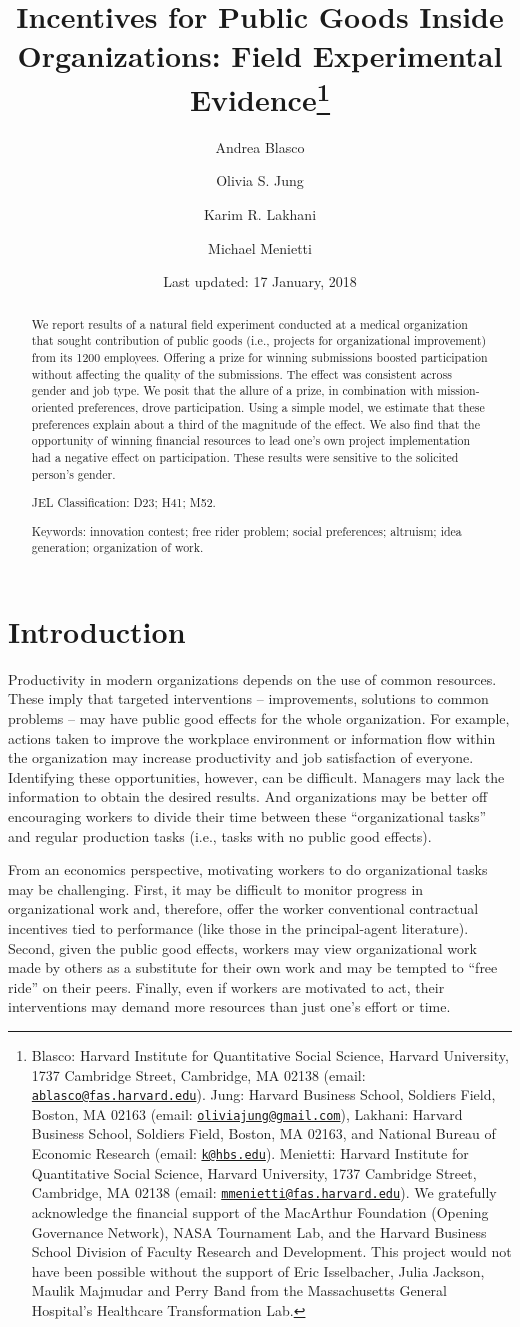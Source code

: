 \documentclass[12pt, titlepage]{article}
\title{Incentives for Public Goods Inside Organizations: Field Experimental
Evidence\thanks{Blasco: Harvard Institute for Quantitative Social Science, Harvard
University, 1737 Cambridge Street, Cambridge, MA 02138 (email:
\href{mailto:ablasco@fas.harvard.edu}{\nolinkurl{ablasco@fas.harvard.edu}}).
Jung: Harvard Business School, Soldiers Field, Boston, MA 02163 (email:
\href{mailto:oliviajung@gmail.com}{\nolinkurl{oliviajung@gmail.com}}),
Lakhani: Harvard Business School, Soldiers Field, Boston, MA 02163, and
National Bureau of Economic Research (email:
\href{mailto:k@hbs.edu}{\nolinkurl{k@hbs.edu}}). Menietti: Harvard
Institute for Quantitative Social Science, Harvard University, 1737
Cambridge Street, Cambridge, MA 02138 (email:
\href{mailto:mmenietti@fas.harvard.edu}{\nolinkurl{mmenietti@fas.harvard.edu}}).
We gratefully acknowledge the financial support of the MacArthur
Foundation (Opening Governance Network), NASA Tournament Lab, and the
Harvard Business School Division of Faculty Research and Development.
This project would not have been possible without the support of Eric
Isselbacher, Julia Jackson, Maulik Majmudar and Perry Band from the
Massachusetts General Hospital's Healthcare Transformation Lab.}}
\author{Andrea Blasco \and Olivia S. Jung \and Karim R. Lakhani \and Michael Menietti}
\date{Last updated: 17 January, 2018}
\begin{document}
\maketitle
\begin{abstract}
We report results of a natural field experiment conducted at a medical
organization that sought contribution of public goods (i.e., projects
for organizational improvement) from its 1200 employees. Offering a
prize for winning submissions boosted participation without affecting
the quality of the submissions. The effect was consistent across gender
and job type. We posit that the allure of a prize, in combination with
mission-oriented preferences, drove participation. Using a simple model,
we estimate that these preferences explain about a third of the
magnitude of the effect. We also find that the opportunity of winning
financial resources to lead one's own project implementation had a
negative effect on participation. These results were sensitive to the
solicited person's gender.

\smallskip\noindent 
JEL Classification: D23; H41; M52.

\smallskip\noindent 
Keywords: innovation contest; free rider problem; social preferences; altruism; idea generation; organization of work.
\end{abstract}


\clearpage

\section{Introduction}\label{introduction}

Productivity in modern organizations depends on the use of common
resources. These imply that targeted interventions -- improvements,
solutions to common problems -- may have public good effects for the
whole organization. For example, actions taken to improve the workplace
environment or information flow within the organization may increase
productivity and job satisfaction of everyone. Identifying these
opportunities, however, can be difficult. Managers may lack the
information to obtain the desired results. And organizations may be
better off encouraging workers to divide their time between these
``organizational tasks'' and regular production tasks (i.e., tasks with
no public good effects).

From an economics perspective, motivating workers to do organizational
tasks may be challenging. First, it may be difficult to monitor progress
in organizational work and, therefore, offer the worker conventional
contractual incentives tied to performance (like those in the
principal-agent literature). Second, given the public good effects,
workers may view organizational work made by others as a substitute for
their own work and may be tempted to ``free ride'' on their peers.
Finally, even if workers are motivated to act, their interventions may
demand more resources than just one's effort or time.
\end{document}
